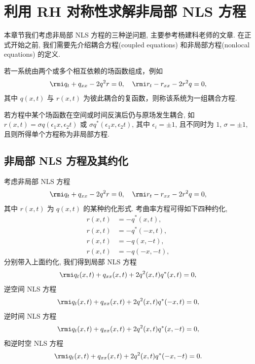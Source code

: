 \chapter{利用 RH 对称性求解非局部 NLS 方程}
本章节我们考虑非局部 NLS 方程的三种逆问题, 主要参考杨建科老师的文章\cite{YANG2019328}. 在正式开始之前, 我们需要先介绍耦合方程(coupled equations) 和非局部方程(nonlocal equations) 的定义.

\begin{definition}[耦合方程]
    若一系统由两个或多个相互依赖的场函数组成，例如
    \begin{equation}
        \rmi q_{t} + q_{xx} - 2q^{2}r = 0, \quad \rmi r_{t} - r_{xx} - 2r^{2}q = 0,
    \end{equation}
    其中 $q(x,t)$ 与 $r(x,t)$ 为彼此耦合的复函数，则称该系统为一组耦合方程.
\end{definition}

\begin{definition}[非局部方程]
    若方程中某个场函数在空间或时间反演后仍与原场发生耦合, 如$ r(x,t) = \sigma q(\epsilon_{1} x, \epsilon_{2} t)$ 或 $\sigma q^{*}(\epsilon_{1} x, \epsilon_{2} t)$, 其中 $\epsilon_{i} = \pm 1$, 且不同时为 $1$, $\sigma = \pm 1$, 且则所得单个方程称为非局部方程.
\end{definition}

\section{非局部 NLS 方程及其约化}
考虑非局部 NLS 方程
\begin{equation}
    \rmi q_{t} + q_{xx} - 2q^{2}r = 0, \quad \rmi r_{t} - r_{xx} - 2r^{2}q = 0, \label{ch3-eq-coupled-NLS}
\end{equation}
其中 $r(x,t)$ 为 $q(x,t)$ 的某种约化形式. 考曲率方程可得如下四种约化,
\begin{align}
    r(x,t) & = -q^{*}(x,t), \label{ch3-eq-local-NLS-reduction}      \\
    r(x,t) & = -q^{*}(-x,t), \label{ch3-eq-reverse-x-NLS-reduction} \\
    r(x,t) & = -q(x,-t), \label{ch3-eq-reverse-t-NLS-reduction}     \\
    r(x,t) & = -q(-x,-t), \label{ch3-eq-reverse-x-t-NLS-reduction}
\end{align}
分别带入上面约化, 我们得到局部 NLS 方程
\begin{equation}
    \rmi q_{t}(x,t) + q_{xx}(x,t) + 2 q^{2}(x,t) q^{*}(x,t) = 0, \label{ch3-eq-local-NLS}
\end{equation}
逆空间 NLS 方程
\begin{equation}
    \rmi q_{t}(x,t) + q_{xx}(x,t) + 2 q^{2}(x,t) q^{*}(-x,t) = 0, \label{ch3-eq-reverse-x-NLS}
\end{equation}
逆时间 NLS 方程
\begin{equation}
    \rmi q_{t}(x,t) + q_{xx}(x,t) + 2 q^{2}(x,t) q^{*}(x,-t) = 0, \label{ch3-eq-reverse-t-NLS}
\end{equation}
和逆时空 NLS 方程
\begin{equation}
    \rmi q_{t}(x,t) + q_{xx}(x,t) + 2 q^{2}(x,t) q^{*}(-x,-t) = 0. \label{ch3-eq-reverse-x-t-NLS}
\end{equation}

